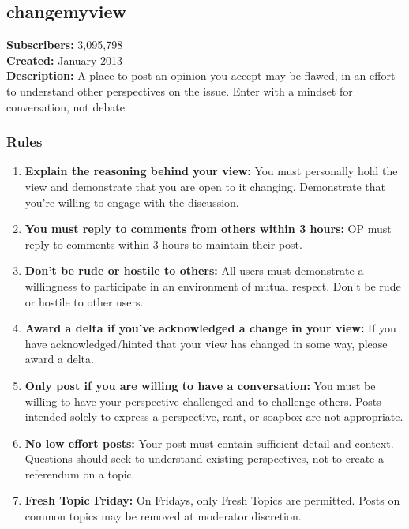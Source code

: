 \subsection{changemyview}
\textbf{Subscribers:} 3,095,798 \\
\textbf{Created:} January 2013 \\
\textbf{Description:} A place to post an opinion you accept may be flawed, in an effort to understand other perspectives on the issue. Enter with a mindset for conversation, not debate.

\subsubsection{Rules}
\begin{enumerate}
    \item \textbf{Explain the reasoning behind your view:} You must personally hold the view and demonstrate that you are open to it changing. Demonstrate that you're willing to engage with the discussion.
    
    \item \textbf{You must reply to comments from others within 3 hours:} OP must reply to comments within 3 hours to maintain their post.
    
    \item \textbf{Don't be rude or hostile to others:} All users must demonstrate a willingness to participate in an environment of mutual respect. Don't be rude or hostile to other users.
    
    \item \textbf{Award a delta if you've acknowledged a change in your view:} If you have acknowledged/hinted that your view has changed in some way, please award a delta.
    
    \item \textbf{Only post if you are willing to have a conversation:} You must be willing to have your perspective challenged and to challenge others. Posts intended solely to express a perspective, rant, or soapbox are not appropriate.
    
    \item \textbf{No low effort posts:} Your post must contain sufficient detail and context. Questions should seek to understand existing perspectives, not to create a referendum on a topic.
    
    \item \textbf{Fresh Topic Friday:} On Fridays, only Fresh Topics are permitted. Posts on common topics may be removed at moderator discretion.
\end{enumerate}


